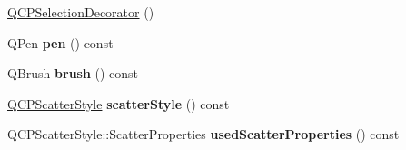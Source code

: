 \begin{DoxyCompactItemize}
\item 
\hyperlink{classQCPSelectionDecorator_aa145480d9a062cd176fe30900bb7bca8}{Q\+C\+P\+Selection\+Decorator} ()
\item 
Q\+Pen {\bfseries pen} () const \hypertarget{classQCPSelectionDecorator_a8365eaa0543756dd6758efa32fbe8041}{}\label{classQCPSelectionDecorator_a8365eaa0543756dd6758efa32fbe8041}

\item 
Q\+Brush {\bfseries brush} () const \hypertarget{classQCPSelectionDecorator_a661b4703ebd3115dc4b07810dd148b20}{}\label{classQCPSelectionDecorator_a661b4703ebd3115dc4b07810dd148b20}

\item 
\hyperlink{classQCPScatterStyle}{Q\+C\+P\+Scatter\+Style} {\bfseries scatter\+Style} () const \hypertarget{classQCPSelectionDecorator_a347df79afebbfd5b5a2c9143214ee5b9}{}\label{classQCPSelectionDecorator_a347df79afebbfd5b5a2c9143214ee5b9}

\item 
Q\+C\+P\+Scatter\+Style\+::\+Scatter\+Properties {\bfseries used\+Scatter\+Properties} () const \hypertarget{classQCPSelectionDecorator_ab82ebdb4915fa7f5c1b253e23e780b13}{}\label{classQCPSelectionDecorator_ab82ebdb4915fa7f5c1b253e23e780b13}


\end{DoxyCompactItemize}
